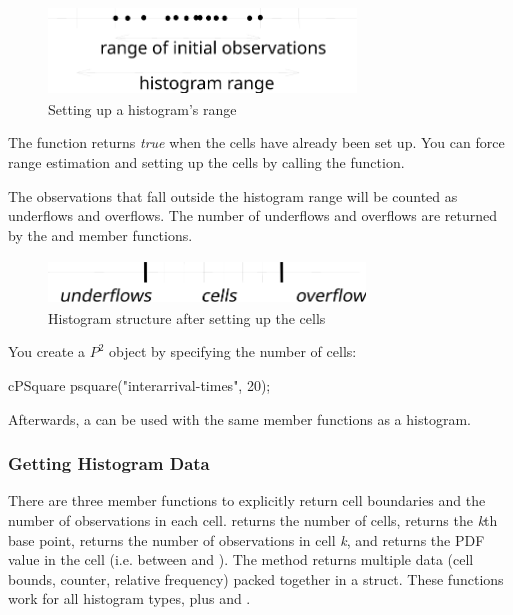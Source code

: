 \begin{figure}[htbp]
  \begin{center}
    \includegraphics[width=3.215in, height=0.930in]{figures/simlib-histogramrange}
    \caption{Setting up a histogram's range}
  \end{center}
\end{figure}

The  function returns \textit{true} when the cells have
already been set up. You can force range estimation and setting
up the cells by calling the  function.

The observations that fall outside the histogram range will be counted
as underflows and overflows. The number of underflows and overflows
are returned by the  and 
member functions.

\begin{figure}[htbp]
\begin{center}
  \includegraphics[width=3.310in, height=0.467in]{figures/simlib-histogramsetup}
  \caption{Histogram structure after setting up the cells}
\end{center}
\end{figure}

You create a $P^{2}$ object by specifying the number of cells:

\begin{cpp}
cPSquare psquare("interarrival-times", 20);
\end{cpp}

Afterwards, a  can be used with the same member functions
as a histogram.


\subsubsection{Getting Histogram Data}


There are three member functions to explicitly return cell boundaries
and the number of observations in each cell.  returns
the number of cells,  returns the
\textit{k}th base point,  returns the
number of observations in cell \textit{k}, and
 returns the PDF value in the cell
(i.e. between  and
).
The  method returns multiple data
(cell bounds, counter, relative frequency) packed together in a struct.
These functions work for all histogram types, plus 
and .

